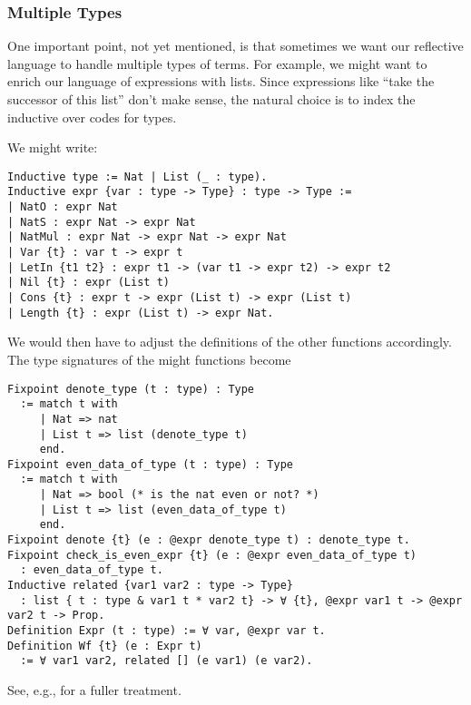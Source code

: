 \subsubsection{Multiple Types} \label{sec:multiple-types-ASTs}
One important point, not yet mentioned, is that sometimes we want our reflective language to handle multiple types of terms.
For example, we might want to enrich our language of expressions with lists.
Since expressions like ``take the successor of this list'' don't make sense, the natural choice is to index the inductive over codes for types.

We might write:
\begin{verbatim}
Inductive type := Nat | List (_ : type).
Inductive expr {var : type -> Type} : type -> Type :=
| NatO : expr Nat
| NatS : expr Nat -> expr Nat
| NatMul : expr Nat -> expr Nat -> expr Nat
| Var {t} : var t -> expr t
| LetIn {t1 t2} : expr t1 -> (var t1 -> expr t2) -> expr t2
| Nil {t} : expr (List t)
| Cons {t} : expr t -> expr (List t) -> expr (List t)
| Length {t} : expr (List t) -> expr Nat.
\end{verbatim}
We would then have to adjust the definitions of the other functions accordingly.
The type signatures of the might functions become

\begin{verbatim}
Fixpoint denote_type (t : type) : Type
  := match t with
     | Nat => nat
     | List t => list (denote_type t)
     end.
Fixpoint even_data_of_type (t : type) : Type
  := match t with
     | Nat => bool (* is the nat even or not? *)
     | List t => list (even_data_of_type t)
     end.
Fixpoint denote {t} (e : @expr denote_type t) : denote_type t.
Fixpoint check_is_even_expr {t} (e : @expr even_data_of_type t)
  : even_data_of_type t.
Inductive related {var1 var2 : type -> Type}
  : list { t : type & var1 t * var2 t} -> ∀ {t}, @expr var1 t -> @expr var2 t -> Prop.
Definition Expr (t : type) := ∀ var, @expr var t.
Definition Wf {t} (e : Expr t)
  := ∀ var1 var2, related [] (e var1) (e var2).
\end{verbatim}

See, e.g., \autocite{PhoasICFP08} for a fuller treatment.

